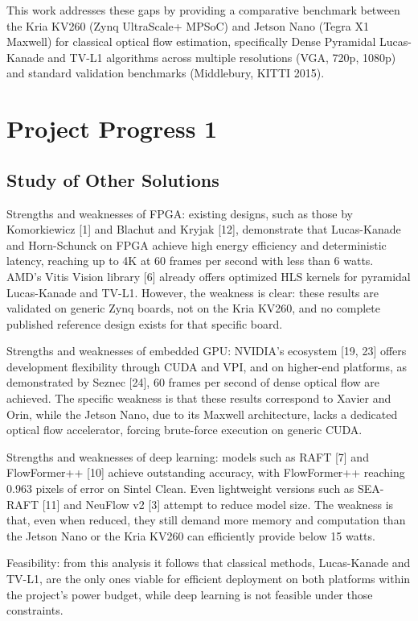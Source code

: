 \documentclass[conference]{IEEEtran}
\begin{document}
This work addresses these gaps by providing a comparative benchmark between the Kria KV260 (Zynq UltraScale+ MPSoC) and Jetson Nano (Tegra X1 Maxwell) for classical optical flow estimation, specifically Dense Pyramidal Lucas-Kanade and TV-L1 algorithms across multiple resolutions (VGA, 720p, 1080p) and standard validation benchmarks (Middlebury, KITTI 2015).

\section{Project Progress 1}

\subsection{Study of Other Solutions}



Strengths and weaknesses of FPGA: existing designs, such as those by Komorkiewicz [1] and Blachut and Kryjak [12], demonstrate that Lucas-Kanade and Horn-Schunck on FPGA achieve high energy efficiency and deterministic latency, reaching up to 4K at 60 frames per second with less than 6 watts. AMD's Vitis Vision library [6] already offers optimized HLS kernels for pyramidal Lucas-Kanade and TV-L1. However, the weakness is clear: these results are validated on generic Zynq boards, not on the Kria KV260, and no complete published reference design exists for that specific board.

Strengths and weaknesses of embedded GPU: NVIDIA's ecosystem [19, 23] offers development flexibility through CUDA and VPI, and on higher-end platforms, as demonstrated by Seznec [24], 60 frames per second of dense optical flow are achieved. The specific weakness is that these results correspond to Xavier and Orin, while the Jetson Nano, due to its Maxwell architecture, lacks a dedicated optical flow accelerator, forcing brute-force execution on generic CUDA.

Strengths and weaknesses of deep learning: models such as RAFT [7] and FlowFormer++ [10] achieve outstanding accuracy, with FlowFormer++ reaching 0.963 pixels of error on Sintel Clean. Even lightweight versions such as SEA-RAFT [11] and NeuFlow v2 [3] attempt to reduce model size. The weakness is that, even when reduced, they still demand more memory and computation than the Jetson Nano or the Kria KV260 can efficiently provide below 15 watts.

Feasibility: from this analysis it follows that classical methods, Lucas-Kanade and TV-L1, are the only ones viable for efficient deployment on both platforms within the project's power budget, while deep learning is not feasible under those constraints.
\end{document}
